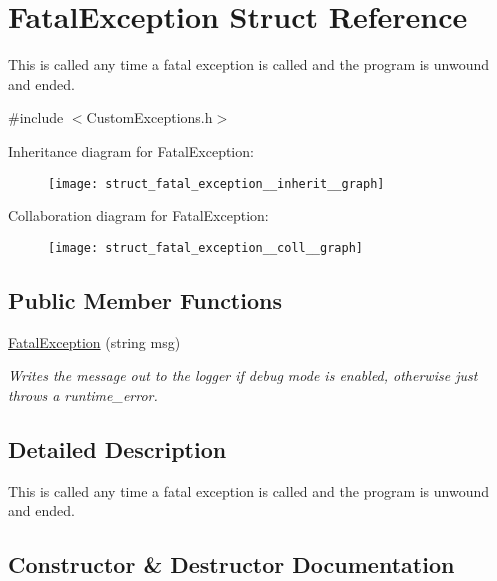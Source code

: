 \hypertarget{struct_fatal_exception}{}\section{Fatal\+Exception Struct Reference}
\label{struct_fatal_exception}


This is called any time a fatal exception is called and the program is unwound and ended.  




{\ttfamily \#include $<$Custom\+Exceptions.\+h$>$}



Inheritance diagram for Fatal\+Exception\+:\nopagebreak
\begin{figure}[H]
\begin{center}
\leavevmode
\texttt{[image: struct\_fatal\_exception\_\_inherit\_\_graph]}
\end{center}
\end{figure}


Collaboration diagram for Fatal\+Exception\+:\nopagebreak
\begin{figure}[H]
\begin{center}
\leavevmode
\texttt{[image: struct\_fatal\_exception\_\_coll\_\_graph]}
\end{center}
\end{figure}
\subsection*{Public Member Functions}
\begin{DoxyCompactItemize}
\item 
\hyperlink{struct_fatal_exception_a0a95484803080c915b5a728b9ab863c6}{Fatal\+Exception} (string msg)
\begin{DoxyCompactList}\small\item\em Writes the message out to the logger if debug mode is enabled, otherwise just throws a runtime\+\_\+error. \end{DoxyCompactList}\end{DoxyCompactItemize}


\subsection{Detailed Description}
This is called any time a fatal exception is called and the program is unwound and ended. 

\subsection{Constructor \& Destructor Documentation}
